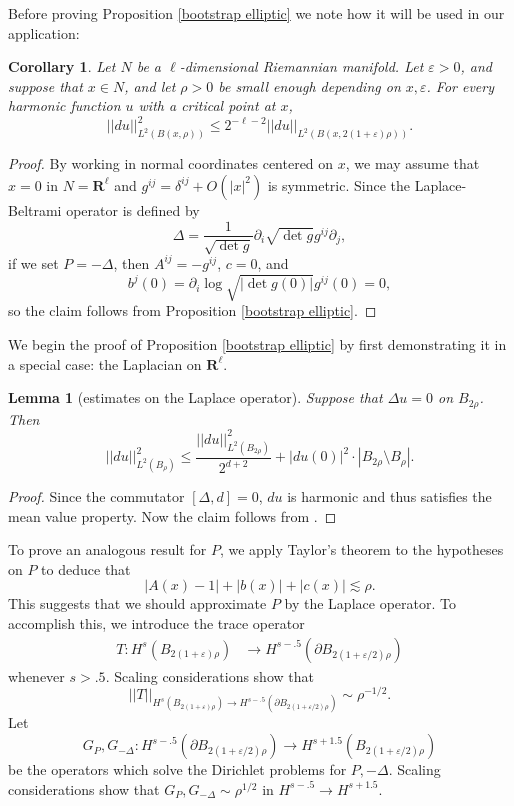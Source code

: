 \documentclass[reqno,12pt,letterpaper]{amsart}
\newcommand{\RR}{\mathbf{R}}
\newtheorem{lemma}[theorem]{Lemma}
\newtheorem{corollary}[theorem]{Corollary}
\theoremstyle{definition}
\numberwithin{equation}{section}
\begin{document}
Before proving Proposition \ref{bootstrap elliptic} we note how it will be used in our application:

\begin{corollary}\label{bootstrap Laplace-Beltrami}
Let $N$ be a $\ell$-dimensional Riemannian manifold.
Let $\varepsilon > 0$, and suppose that $x \in N$, and let $\rho > 0$ be small enough depending on $x, \varepsilon$.
For every harmonic function $u$ with a critical point at $x$,
$$||du||_{L^2(B(x, \rho))}^2 \leq 2^{-\ell-2} ||du||_{L^2(B(x, 2(1 + \varepsilon)\rho))}.$$
\end{corollary}
\begin{proof}
By working in normal coordinates centered on $x$, we may assume that $x = 0$ in $N = \RR^\ell$ and $g^{ij} = \delta^{ij} + O(|x|^2)$ is symmetric.
Since the Laplace-Beltrami operator is defined by
$$\Delta = \frac{1}{\sqrt{\det g}} \partial_i \sqrt{\det g} g^{ij} \partial_j,$$
if we set $P = -\Delta$, then $A^{ij} = -g^{ij}$, $c = 0$, and
$$b^j(0) = \partial_i \log \sqrt{|\det g(0)|} g^{ij}(0) = 0,$$
so the claim follows from Proposition \ref{bootstrap elliptic}.
\end{proof}

We begin the proof of Proposition \ref{bootstrap elliptic} by first demonstrating it in a special case: the Laplacian on $\RR^\ell$.

\begin{lemma}[estimates on the Laplace operator]\label{bootstrap Laplace}
Suppose that $\Delta u = 0$ on $B_{2\rho}$.
Then
$$||du||_{L^2(B_\rho)}^2 \leq \frac{||du||_{L^2(B_{2\rho})}^2}{2^{d + 2}} + |du(0)|^2 \cdot |B_{2\rho} \setminus B_\rho|.$$
\end{lemma}
\begin{proof}
Since the commutator $[\Delta, d] = 0$, $du$ is harmonic and thus satisfies the mean value property.
Now the claim follows from \cite[Lemma 4.1]{Miranda66}.
\end{proof}

To prove an analogous result for $P$, we apply Taylor's theorem to the hypotheses on $P$ to deduce that
\begin{equation}\label{Taylor coefficients are small}
|A(x) - 1| + |b(x)| + |c(x)| \lesssim \rho.
\end{equation}
This suggests that we should approximate $P$ by the Laplace operator.
To accomplish this, we introduce the trace operator
\begin{align*}
T: H^s(B_{2(1 + \varepsilon)\rho}) &\to H^{s-.5}(\partial B_{2(1 + \varepsilon/2)\rho})
\end{align*}
whenever $s > .5$.
Scaling considerations show that
$$||T||_{H^s(B_{2(1 + \varepsilon)\rho}) \to H^{s - .5}(\partial B_{2(1 + \varepsilon/2)\rho})} \sim \rho^{-1/2}.$$
Let
$$G_P, G_{-\Delta}: H^{s - .5}(\partial B_{2(1 + \varepsilon/2)\rho}) \to H^{s + 1.5}(B_{2(1 + \varepsilon/2)\rho})$$
be the operators which solve the Dirichlet problems for $P,-\Delta$.
Scaling considerations show that $G_P, G_{-\Delta} \sim \rho^{1/2}$ in $H^{s - .5} \to H^{s + 1.5}$.
\end{document}
